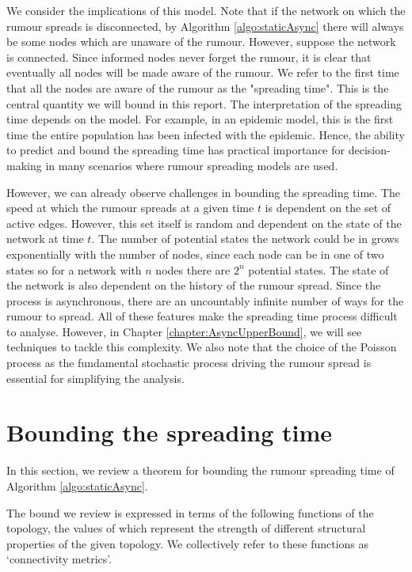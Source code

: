 We consider the implications of this model. 
Note that if the network on which the rumour spreads is disconnected, by Algorithm \ref{algo:staticAsync} there will always be some nodes which are unaware of the rumour. However, suppose the network is connected.
Since informed nodes never forget the rumour, it is clear that eventually all nodes will be made aware of the rumour. We refer to the first time that all the nodes are aware of the rumour as the "spreading time". This is the central quantity we will bound in this report. The interpretation of the spreading time depends on the model. For example, in an epidemic model, this is the first time the entire population has been infected with the epidemic. Hence, the ability to predict and bound the spreading time has practical importance for decision-making in many scenarios where rumour spreading models are used.

However, we can already observe challenges in bounding the spreading time. The speed at which the rumour spreads at a given time $t$ is dependent on the set of active edges. However, this set itself is random and dependent on the state of the network at time $t$. The number of potential states the network could be in grows exponentially with the number of nodes, since each node can be in one of two states so for a network with $n$ nodes there are $2^n$ potential states. The state of the network is also dependent on the history of the rumour spread.
Since the process is asynchronous, there are an uncountably infinite number of ways for the rumour to spread. All of these features make the spreading time process difficult to analyse. However, in Chapter \ref{chapter:AsyncUpperBound}, we will see techniques to tackle this complexity. We also note that the choice of the Poisson process as the fundamental stochastic process driving the rumour spread is essential for simplifying the analysis.

\section{Bounding the spreading time}\label{section:graphMetrics}

In this section, we review a theorem for bounding the rumour spreading time of Algorithm \ref{algo:staticAsync}.

The bound we review is expressed in terms of the following functions of the topology, the values of which represent the strength of different structural properties of the given topology. We collectively refer to these functions as `connectivity metrics'.

